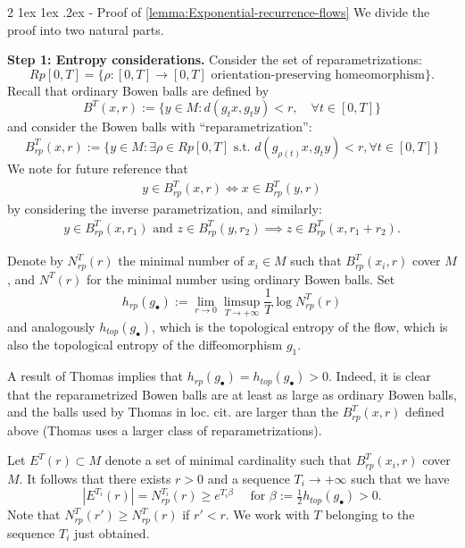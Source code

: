 \documentclass[11pt]{amsart}
\makeatletter
\renewcommand{\subsection}
{\@startsection{subsection}
				     {2}
				     {\z@}%
                     {-3.25ex\@plus -1ex \@minus -.2ex}%
                     {1.5ex \@plus .2ex}%
                     {\normalfont \large \bfseries \sffamily}}%
\newcommand{\abs}[1]{\left|#1\right|}
\theoremstyle{mytheoremstyle}
\theoremstyle{mydefinitionstyle}
\theoremstyle{mytheoremstyle}
\numberwithin{equation}{section}
\renewcommand{\subsection}
{\@startsection{subsection}
                     {2}
                     {\z@}%
                     {1ex \@plus1ex \@minus.2ex}%
                     {-\fontdimen 2\font }
                     {\normalfont\normalsize\bfseries}}
\theoremstyle{mydefinitionstyle}
\makeatother
\begin{document}

\subsection{Proof of \autoref{lemma:Exponential-recurrence-flows}}
  \label{ssec:proof_of_exponential_recurrence_flows}
We divide the proof into two natural parts.

\noindent\textbf{Step 1: Entropy considerations.}
Consider the set of reparametrizations:
\[
  Rp[0,T] =\{\rho\colon [0,T]\to [0,T]\text{ orientation-preserving homeomorphism}\}.
\]
Recall that ordinary Bowen balls are defined by
\[
  B^T(x,r):=\{y\in M\colon d(g_t x, g_t y)<r, \quad \forall t\in [0,T]\}
\]
and consider the Bowen balls with ``reparametrization'':
\[
  B^T_{rp}(x,r):= \{y\in M\colon \exists \rho\in Rp[0,T] \text{ s.t. }d(g_{\rho(t)} x, g_{t}y)< r
  ,\forall t\in [0,T]\}
\]
We note for future reference that
\begin{align}
  \label{eqn:reparam_ball_symmetry}
  y\in B^T_{rp}(x,r) \iff x\in B^T_{rp}(y,r)  
\end{align}
by considering the inverse parametrization, and similarly:
\begin{align}
  \label{eqn:reparam_ball_triangle}
  y\in B^T_{rp}(x,r_1) \text{ and } z \in B^T_{rp}(y,r_2)
  \implies 
  z \in B^T_{rp}(x,r_1+r_2).
\end{align}

Denote by $N^T_{rp}(r)$ the minimal number of $x_i\in M$ such that $B^T_{rp}(x_i,r)$ cover $M$, and $N^T(r)$ for the minimal number using ordinary Bowen balls.
Set
\[
  h_{rp}(g_\bullet):=\lim_{r\to 0}\limsup_{T\to +\infty} \frac{1}{T}\log N^T_{rp}(r)
\]
and analogously $h_{top}(g_\bullet)$, which is the topological entropy of the flow, which is also the topological entropy of the diffeomorphism $g_1$.

A result of Thomas \cite[Thm.~10]{Thomas1990_Topological-entropy-of-fixed-point-free-flows} implies that $h_{rp}(g_\bullet)=h_{top}(g_\bullet)>0$.
Indeed, it is clear that the reparametrized Bowen balls are at least as large as ordinary Bowen balls, and the balls used by Thomas in loc. cit. are larger than the $B_{rp}^T(x,r)$ defined above (Thomas uses a larger class of reparametrizations).

Let $E^T(r)\subset M$ denote a set of minimal cardinality such that $B^T_{rp}(x_i,r)$ cover $M$.
It follows that there exists $r>0$ and a sequence $T_i\to +\infty$ such that we have
\[
  \abs{E^{T_i}(r)}=N^{T_i}_{rp}(r)\geq e^{T_i\beta} \quad \text{ for }\beta:=\tfrac 12h_{top}(g_\bullet)>0.
\]
Note that $N^T_{rp}(r')\geq N^T_{rp}(r)$ if $r'<r$.
We work with $T$ belonging to the sequence $T_i$ just obtained.
\end{document}
